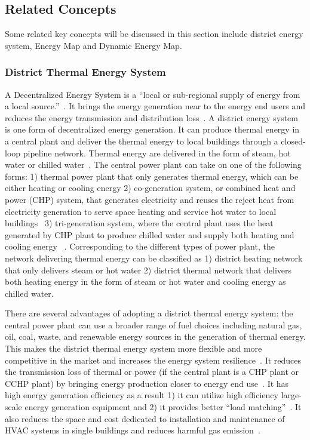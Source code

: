 \documentclass[hidelinks,12pt]{article}
\begin{document}
\subsection{Related Concepts}\label{concept}
Some related key concepts will be discussed in this section include
district energy system, Energy Map and Dynamic Energy Map.

\subsubsection{District Thermal Energy System}
A Decentralized Energy System is a ``local or sub-regional supply of
energy from a local source.''~\cite{lhmreport2012}. It brings the
energy generation near to the energy end users and reduces the energy
transmission and distribution loss~\cite{decentralHeatMap2011}. A
district energy system is one form of decentralized energy
generation. It can produce thermal energy in a central plant and
deliver the thermal energy to local buildings through a closed-loop
pipeline network. Thermal energy are delivered in the form of steam,
hot water or chilled water~\cite{baird2014}. The central power plant
can take on one of the following forms: 1) thermal power plant that
only generates thermal energy, which can be either heating or cooling
energy 2) co-generation system, or combined heat and power (CHP)
system, that generates electricity and reuses the reject heat from
electricity generation to serve space heating and service hot water to
local buildings~\cite{IDEA2005} 3) tri-generation system, where the
central plant uses the heat generated by CHP plant to produce chilled
water and supply both heating and cooling energy
~\cite{cchp2015}. Corresponding to the different types of power plant,
the network delivering thermal energy can be classified as 1) district
heating network that only delivers steam or hot water 2) district
thermal network that delivers both heating energy in the form of
steam or hot water and cooling energy as chilled water.

There are several advantages of adopting a district thermal energy
system: the central power plant can use a broader range of fuel
choices including natural gas, oil, coal, waste, and renewable energy
sources in the generation of thermal energy. This makes the district
thermal energy system more flexible and more competitive in the market
and increases the energy system resilience~\cite{IDEA2005}. It reduces
the transmission loss of thermal or power (if the central plant is a
CHP plant or CCHP plant) by bringing energy production closer to
energy end use~\cite{decentralHeatMap2011}. It has high energy
generation efficiency as a result 1) it can utilize high efficiency
large-scale energy generation equipment and 2) it provides better
``load matching''~\cite{IDEA2005}. It also reduces the space and cost
dedicated to installation and maintenance of HVAC systems in single
buildings and reduces harmful gas emission~\cite{IDEA2005}.
\end{document}
